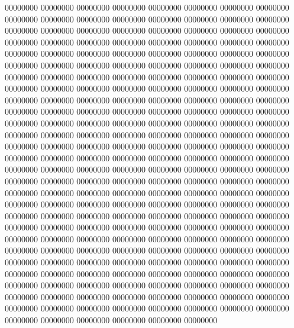 00000000
00000000
00000000
00000000
00000000
00000000
00000000
00000000
00000000
00000000
00000000
00000000
00000000
00000000
00000000
00000000
00000000
00000000
00000000
00000000
00000000
00000000
00000000
00000000
00000000
00000000
00000000
00000000
00000000
00000000
00000000
00000000
00000000
00000000
00000000
00000000
00000000
00000000
00000000
00000000
00000000
00000000
00000000
00000000
00000000
00000000
00000000
00000000
00000000
00000000
00000000
00000000
00000000
00000000
00000000
00000000
00000000
00000000
00000000
00000000
00000000
00000000
00000000
00000000
00000000
00000000
00000000
00000000
00000000
00000000
00000000
00000000
00000000
00000000
00000000
00000000
00000000
00000000
00000000
00000000
00000000
00000000
00000000
00000000
00000000
00000000
00000000
00000000
00000000
00000000
00000000
00000000
00000000
00000000
00000000
00000000
00000000
00000000
00000000
00000000
00000000
00000000
00000000
00000000
00000000
00000000
00000000
00000000
00000000
00000000
00000000
00000000
00000000
00000000
00000000
00000000
00000000
00000000
00000000
00000000
00000000
00000000
00000000
00000000
00000000
00000000
00000000
00000000
00000000
00000000
00000000
00000000
00000000
00000000
00000000
00000000
00000000
00000000
00000000
00000000
00000000
00000000
00000000
00000000
00000000
00000000
00000000
00000000
00000000
00000000
00000000
00000000
00000000
00000000
00000000
00000000
00000000
00000000
00000000
00000000
00000000
00000000
00000000
00000000
00000000
00000000
00000000
00000000
00000000
00000000
00000000
00000000
00000000
00000000
00000000
00000000
00000000
00000000
00000000
00000000
00000000
00000000
00000000
00000000
00000000
00000000
00000000
00000000
00000000
00000000
00000000
00000000
00000000
00000000
00000000
00000000
00000000
00000000
00000000
00000000
00000000
00000000
00000000
00000000
00000000
00000000
00000000
00000000
00000000
00000000
00000000
00000000
00000000
00000000
00000000
00000000
00000000
00000000
00000000
00000000
00000000
00000000
